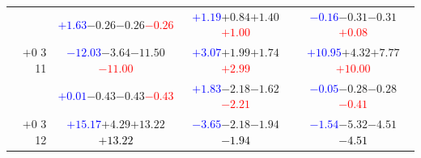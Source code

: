 \documentclass[compress]{beamer}
\begin{document}
\begin{frame}
\begin{tabular}{r | c | c | c}
          & \textcolor{blue}{$+1.63$}\hspace{0.1 cm}$-0.26$\hspace{0.1 cm}$-0.26$\hspace{0.1 cm}\textcolor{red}{$-0.26$} & \textcolor{blue}{$+1.19$}\hspace{0.1 cm}$+0.84$\hspace{0.1 cm}$+1.40$\hspace{0.1 cm}\textcolor{red}{$+1.00$} & \textcolor{blue}{$-0.16$}\hspace{0.1 cm}$-0.31$\hspace{0.1 cm}$-0.31$\hspace{0.1 cm}\textcolor{red}{$+0.08$} \\
$+$0 3 11 & \textcolor{blue}{$-12.03$}\hspace{0.1 cm}$-3.64$\hspace{0.1 cm}$-11.50$\hspace{0.1 cm}\textcolor{red}{$-11.00$} & \textcolor{blue}{$+3.07$}\hspace{0.1 cm}$+1.99$\hspace{0.1 cm}$+1.74$\hspace{0.1 cm}\textcolor{red}{$+2.99$} & \textcolor{blue}{$+10.95$}\hspace{0.1 cm}$+4.32$\hspace{0.1 cm}$+7.77$\hspace{0.1 cm}\textcolor{red}{$+10.00$} \\
          & \textcolor{blue}{$+0.01$}\hspace{0.1 cm}$-0.43$\hspace{0.1 cm}$-0.43$\hspace{0.1 cm}\textcolor{red}{$-0.43$} & \textcolor{blue}{$+1.83$}\hspace{0.1 cm}$-2.18$\hspace{0.1 cm}$-1.62$\hspace{0.1 cm}\textcolor{red}{$-2.21$} & \textcolor{blue}{$-0.05$}\hspace{0.1 cm}$-0.28$\hspace{0.1 cm}$-0.28$\hspace{0.1 cm}\textcolor{red}{$-0.41$} \\
$+$0 3 12 & \textcolor{blue}{$+15.17$}\hspace{0.1 cm}$+4.29$\hspace{0.1 cm}$+13.22$\hspace{0.1 cm}\textcolor{black}{$+13.22$} & \textcolor{blue}{$-3.65$}\hspace{0.1 cm}$-2.18$\hspace{0.1 cm}$-1.94$\hspace{0.1 cm}\textcolor{black}{$-1.94$} & \textcolor{blue}{$-1.54$}\hspace{0.1 cm}$-5.32$\hspace{0.1 cm}$-4.51$\hspace{0.1 cm}\textcolor{black}{$-4.51$} \\

\end{tabular}
\end{frame}
\end{document}
